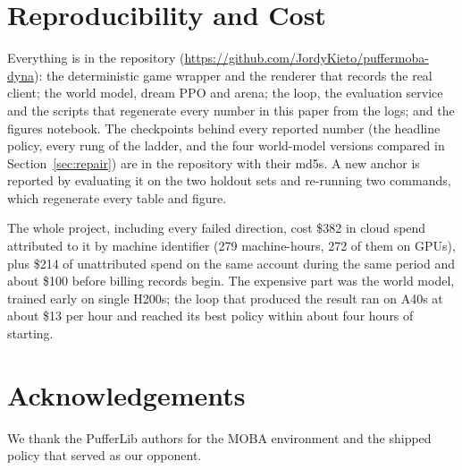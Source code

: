 \documentclass[11pt]{article}
\newcommand{\repo}{\url{https://github.com/JordyKieto/puffermoba-dyna}}
\begin{document}
\section{Reproducibility and Cost}
\label{sec:repro}

Everything is in the repository (\repo): the deterministic game wrapper and the renderer that records the real client; the world model, dream PPO and arena; the loop, the evaluation service and the scripts that regenerate every number in this paper from the logs; and the figures notebook. The checkpoints behind every reported number (the headline policy, every rung of the ladder, and the four world-model versions compared in Section~\ref{sec:repair}) are in the repository with their md5s. A new anchor is reported by evaluating it on the two holdout sets and re-running two commands, which regenerate every table and figure.

The whole project, including every failed direction, cost \$382 in cloud spend attributed to it by machine identifier (279 machine-hours, 272 of them on GPUs), plus \$214 of unattributed spend on the same account during the same period and about \$100 before billing records begin. The expensive part was the world model, trained early on single H200s; the loop that produced the result ran on A40s at about \$13 per hour and reached its best policy within about four hours of starting.

\section*{Acknowledgements}
We thank the PufferLib authors for the MOBA environment and the shipped policy that served as our opponent.
\end{document}
